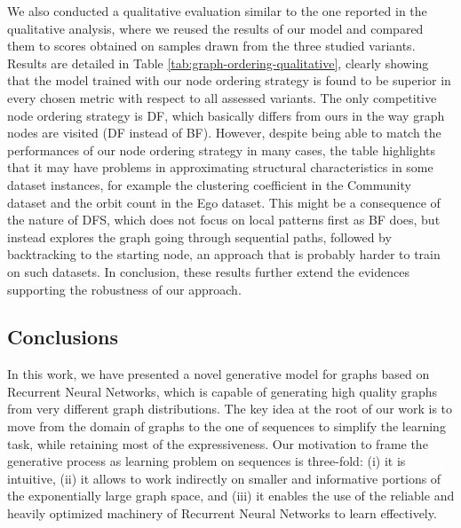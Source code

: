 We also conducted a qualitative evaluation similar to the one reported in the qualitative analysis, where we reused the results of our model and compared them to scores obtained on samples drawn from the three studied variants. Results are detailed in Table \ref{tab:graph-ordering-qualitative}, clearly showing that the model trained with our node ordering strategy is found to be superior in every chosen metric with respect to all assessed variants. The only competitive node ordering strategy is DF, which basically differs from ours in the way graph nodes are visited (DF instead of BF). However, despite being able to match the performances of our node ordering strategy in many cases, the table highlights that it may have problems in approximating structural characteristics in some dataset instances, for example the clustering coefficient in the Community dataset and the orbit count in the Ego dataset. This might be a consequence of the nature of DFS, which does not focus on local patterns first as BF does, but instead explores the graph going through sequential paths, followed by backtracking to the starting node, an approach that is probably harder to train on such datasets. In conclusion, these results further extend the evidences supporting the robustness of our approach.



\subsection{Conclusions}
In this work, we have presented a novel generative model for graphs based on Recurrent Neural Networks, which is capable of generating high quality graphs from very different graph distributions. The key idea at the root of our work is to move from the domain of graphs to the one of sequences to simplify the learning task, while retaining most of the expressiveness. Our motivation to frame the generative process as learning problem on sequences is three-fold: (i) it is intuitive, (ii) it allows to work indirectly on smaller and informative portions of the exponentially large graph space, and (iii) it enables the use of the reliable and heavily optimized machinery of Recurrent Neural Networks to learn effectively.

